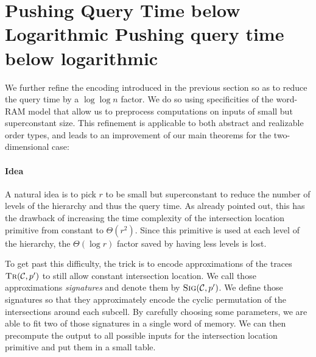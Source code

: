 \section{\iftitlecase%
Pushing Query Time below Logarithmic\else%
Pushing query time below logarithmic\fi}\label{sec:query-time}

We further refine the encoding introduced in the previous section so as to
reduce the query time by a \( \log\log n \) factor. We do so using
specificities of the word-RAM model that allow us to preprocess computations
on inputs of small but superconstant size.
%
This refinement is applicable to both abstract and realizable order types,
and leads to an improvement of our main theorems for the two-dimensional case:
%




\paragraph{Idea}

A natural idea is to pick \(r\) to be small but superconstant to reduce the
number of levels of the hierarchy and thus the query time. As already pointed
out, this has the drawback of increasing the time complexity of the intersection
location primitive from constant to \(\Theta(r^2)\).
Since this primitive is used at each level of the hierarchy, the
\(\Theta(\log r)\) factor saved by having less levels is lost.

To get past this difficulty,
the trick is to encode approximations of the traces
\(\textsc{Tr}(\mathcal{C}, p')\) to still allow constant intersection location.
We call those approximations \emph{signatures} and denote them by
\(\textsc{Sig}(\mathcal{C}, p')\).
%
We define those signatures so that they approximately encode the cyclic
permutation of the intersections around each subcell. By carefully choosing some
parameters, we are able to fit two of those signatures in a single word of
memory. We can then precompute the output to all
possible inputs for the intersection location primitive and put them in a small
table.

